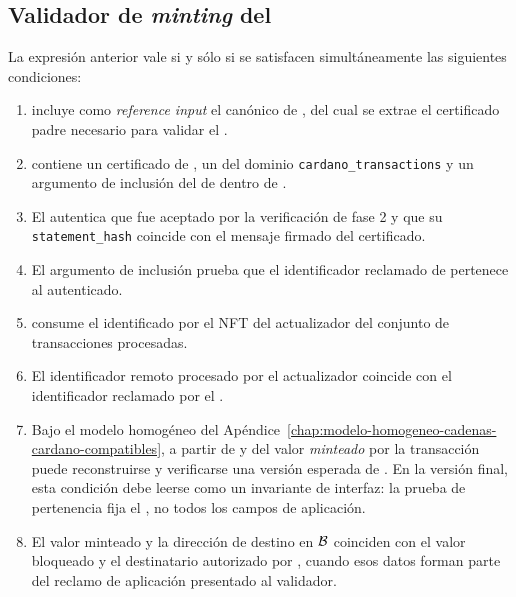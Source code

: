\subsection{Validador de \textit{minting} del \zkBridge}
\label{subsec:validadores-y-flujo-transaccional-validador-de-minting-del-zkbridge}

\begin{center}
\MintValidatorNotation{\MintingValidator}
\end{center}

La expresión anterior vale si y sólo si se satisfacen simultáneamente las siguientes condiciones:

\begin{enumerate}[noitemsep]
  \item \tx incluye como \textit{reference input} el \UTxO canónico de \StakeDistribution \StakeDistributionUTxO, del cual se extrae el certificado padre \StakeDistributionCertificate necesario para validar el \TransactionSnapshot.
  \item \redeemer contiene un certificado \TransactionSnapshotCertificate de \TransactionSnapshot, un \ProofReceipt del dominio \texttt{cardano\_transactions} y un argumento \Groth de inclusión del \TxId de \LockTx dentro de \TransactionSnapshotCertificate.
  \item El \ProofReceipt autentica que \TransactionSnapshotCertificate fue aceptado por la verificación \STM de fase 2 y que su \texttt{statement\_hash} coincide con el mensaje firmado del certificado.
  \item El argumento \Groth de inclusión prueba que el identificador reclamado de \LockTx pertenece al \TransactionSnapshotCertificate autenticado.
  \item \tx consume el \UTxO identificado por el NFT del actualizador del conjunto de transacciones procesadas.
  \item El identificador remoto procesado por el actualizador coincide con el identificador reclamado por el \MintingValidator.
  \item Bajo el modelo homogéneo del Apéndice~\ref{chap:modelo-homogeneo-cadenas-cardano-compatibles}, a partir de \redeemer y del valor \textit{minteado} por la transacción puede reconstruirse y verificarse una versión esperada de \LockTx. En la versión final, esta condición debe leerse como un invariante de interfaz: la prueba de pertenencia fija el \TxId, no todos los campos de aplicación.
  \item El valor minteado y la dirección de destino en $\mathcal{B}$ coinciden con el valor bloqueado y el destinatario autorizado por \LockTx, cuando esos datos forman parte del reclamo de aplicación presentado al validador.
\end{enumerate}

